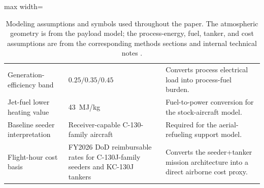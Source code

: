 \documentclass[8pt,twocolumn]{extarticle}
\begin{document}
\begin{table}[t]
\begin{adjustbox}{max width=\textwidth}
\begin{tabular}{p{} p{} p{}}
Generation-efficiency band & $0.25 / 0.35 / 0.45$ & Converts process electrical load into process-fuel burden. \\
Jet-fuel lower heating value & \SI{43}{MJ/kg} & Fuel-to-power conversion for the stock-aircraft model. \\
Baseline seeder interpretation & Receiver-capable C-130-family aircraft & Required for the aerial-refueling support model. \\
Flight-hour cost basis & FY2026 DoD reimbursable rates for C-130J-family seeders and KC-130J tankers & Converts the seeder+tanker mission architecture into a direct airborne cost proxy. \\
\bottomrule
\end{tabular}
\end{adjustbox}
\caption{Modeling assumptions and symbols used throughout the paper. The atmospheric geometry is from the payload model; the process-energy, fuel, tanker, and cost assumptions are from the corresponding methods sections and internal technical notes \citep{AeolusPayloadMethods,AeolusPowerNote,AeolusFuelNote,AeolusCostNote}.}
\label{tab:assumptions}
\end{table}
\end{document}

